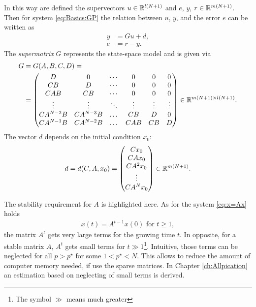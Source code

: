 In this way are defined the supervectors $u \in {\mathbb{R}}^{l(N+1)} $ and $e$, $y$, $r \in {\mathbb{R}}^{m(N+1)}$.  
Then for system \eqref{eq:Basics:GP} the relation between $u$, $y$, and the error $e$ can be written as
\begin{align}
\label{eq:Gu + d}
y &= Gu + d, \\
e &= r - y.
\end{align}
The \textit{supermatrix} $G$ represents the state-space model and is given via  
\begin{align}
\label{eq:Gmatrix}
\begin{split}
G &= G(A,B,C,D) = \\
&=  \begin{pmatrix}
D & 0 & \cdots & 0 & 0 & 0 \\
CB & D & \cdots & 0 & 0 & 0\\
CAB & CB & \cdots & 0 & 0 & 0\\
\vdots & \vdots & \ddots & \vdots  & \vdots & \vdots \\
CA^{N-2} B & CA^{N-3} B &\dots &CB & D& 0\\
CA^{N-1} B & CA^{N-2} B &\dots &CAB & CB& D\\
\end{pmatrix} \in {\mathbb{R}}^{m(N+1)\times l(N+1)}.
\end{split}
\end{align}
The vector $d$ depends on the initial condition $x_0$:
\begin{align}
d = d(C,A,x_0) = \begin{pmatrix}
C x_0 \\ CA x_0 \\ CA^2 x_0 \\ \vdots \\ CA^Nx_0
\end{pmatrix} \in {\mathbb{R}}^{m(N+1)}.
\end{align}

The stability requirement for $A$ is highlighted here. As for the system \eqref{eq:x=Ax} holds
\begin{align}
x(t) = A^{t-1}x(0) \text{ for } t\geq 1, 
\end{align}
the matrix $A^t$ gets very large terms for the growing time $t$. 
In opposite, for a stable matrix $A$, $A^t$ gets small terms for $t \gg 1$\footnote{The symbol $\gg$ means much greater}. Intuitive, those terms can be neglected for all $p > p^\star$ for some $1<p^\star<N$. This allows to reduce the amount of computer memory needed, if use the sparse matrices. In Chapter \ref{ch:Allpication} an estimation based on neglecting of small terms is derived. 


